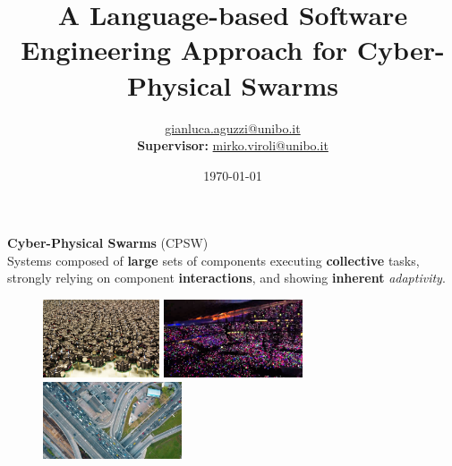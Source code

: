 \documentclass[presentation, 8pt,169]{beamer}\mode<presentation>{\usetheme{AMSBolognaFC}}
\title[A Soft-Eng Approach for CPSWs!]
{A Language-based Software Engineering Approach for Cyber-Physical Swarms}
\author[\sspeaker{G.Aguzzi}]
{\speaker{Gianluca Aguzzi} \href{mailto:gianluca.aguzzi@unibo.it}{gianluca.aguzzi@unibo.it} \\
\textbf{Supervisor:} \speaker{Mirko Viroli} \href{mailto:mirko.viroli@unibo.it}{mirko.viroli@unibo.it}}
\institute[DISI, Univ.\ Bologna]
{%
\textsc{Alma Mater Studiorum} -- Universit{\`a} di Bologna \\[0.1cm]
\textbf{PhD defense}\\[0.15cm]
}
\date[\today]{\today}
\begin{document}

\frame{\titlepage}

\section*{\refname}


\begin{frame}[plain,c]
  \begin{center}
  {\Huge \textbf{Cyber-Physical Swarms} (CPSW)}\\
  {\large Systems composed of \textbf{large} sets of components executing \textbf{collective} tasks, strongly relying on component \textbf{interactions}, and showing \textbf{inherent} \emph{adaptivity}.}\\[0.5cm] 
  \begin{figure}
      \centering
      \includegraphics[height=2.3cm]{img/swarms.jpg}
      \includegraphics[height=2.3cm]{img/coldplay.jpg}
      \includegraphics[height=2.3cm]{img/traffic.jpg} 
  \end{figure}
  \end{center}
\end{frame}
\end{document}

